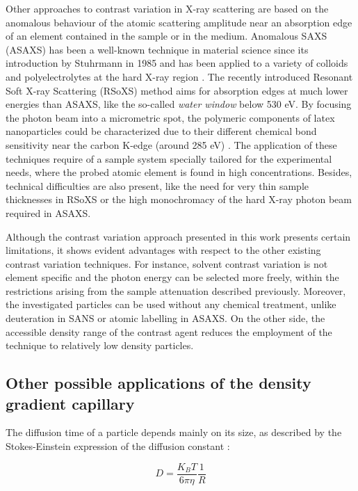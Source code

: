 Other approaches to contrast variation in X-ray scattering are based on the anomalous behaviour of the atomic scattering amplitude near an absorption edge of an element contained in the sample or in the medium. Anomalous SAXS (ASAXS) has been a well-known technique in material science since its introduction by Stuhrmann in 1985 \citep{stuhrmann_resonance_1985} and has been applied to a variety of colloids and polyelectrolytes at the hard X-ray region \citep{goerigk_anomalous_2003, stuhrmann_contrast_2007,lages_saxs_2013}. The recently introduced Resonant Soft X-ray Scattering (RSoXS) method aims for absorption edges at much lower energies than ASAXS, like the so-called \emph{water window} below 530 eV. By focusing the photon beam into a micrometric spot, the polymeric components of latex nanoparticles could be characterized due to their different chemical bond sensitivity near the carbon K-edge (around 285 eV) \citep{mitchell_molecular_2006,araki_resonant_2006}. The application of these techniques require of a sample system specially tailored for the experimental needs, where the probed atomic element is found in high concentrations. Besides, technical difficulties are also present, like the need for very thin sample thicknesses in RSoXS or the high monochromacy of the hard X-ray photon beam required in ASAXS.

Although the contrast variation approach presented in this work presents certain limitations, it shows evident advantages with respect to the other existing contrast variation techniques. For instance, solvent contrast variation is not element specific and the photon energy can be selected more freely, within the restrictions arising from the sample attenuation described previously. Moreover, the investigated particles can be used without any chemical treatment, unlike deuteration in SANS or atomic labelling in ASAXS. On the other side, the accessible density range of the contrast agent reduces the employment of the technique to relatively low density particles.

\subsection{Other possible applications of the density gradient capillary}

The diffusion time of a particle depends mainly on its size, as described by the Stokes-Einstein expression of the diffusion constant \citep{einstein_uber_1905}:

\begin{equation}
        D=\frac{K_B T}{6\pi \eta }\frac{1}{R}
\end{equation}

